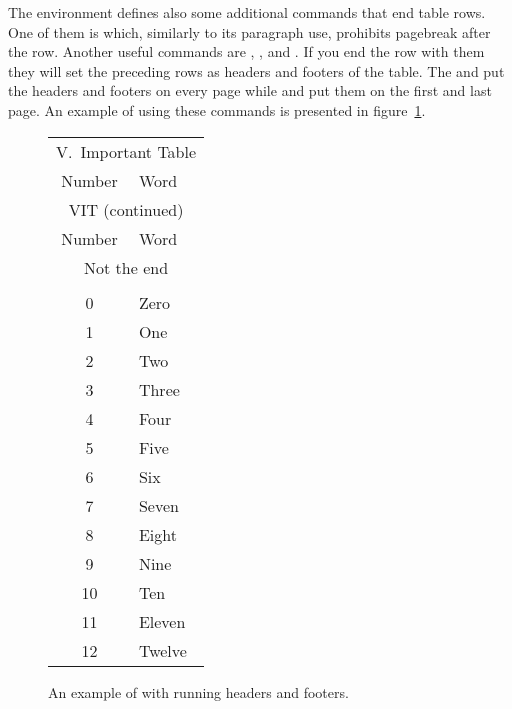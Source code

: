The  environment defines also some additional commands that end
table rows. One of them is \ci{\textbackslash*} which, similarly to its
paragraph use, prohibits pagebreak after the row. Another useful commands are
, ,  and . If you end
the row with them they will set the preceding rows as headers and footers of
the table. The  and  put the headers and footers on
every page while  and  put them on the first
and last page. An example of using these commands is presented in
figure~\ref{ex:longtable}.
\begin{figure}[htp]
  \begin{example}[standalone, to_page=2, paperwidth=4.3cm] 
\usepackage{longtable}
\usepackage{booktabs}

\begin{longtable}{cl}
  \toprule
  \multicolumn{2}{c}{
    V.~Important Table} \\
  Number & Word         \\
  \midrule \endfirsthead

  \toprule
  \multicolumn{2}{c}{
    VIT (continued)} \\
  Number & Word      \\
  \midrule \endhead

  \midrule
  \multicolumn{2}{c}{
    Not the end} \\
  \bottomrule \endfoot

  \midrule
  \multicolumn{2}{c}{
    The end of VIT} \\
  \bottomrule \endlastfoot

  0      & Zero   \\
  1      & One    \\
  2      & Two     \\
  3      & Three \\
  4      & Four  \\
  5      & Five  \\
  6      & Six   \\
  7      & Seven \\
  8      & Eight \\
  9      & Nine  \\
  10     & Ten    \\
  11     & Eleven \\
  12     & Twelve \\
\end{longtable}
\end{example}
  \caption{An example of  with running headers and footers.}\label{ex:longtable}
\end{figure}

